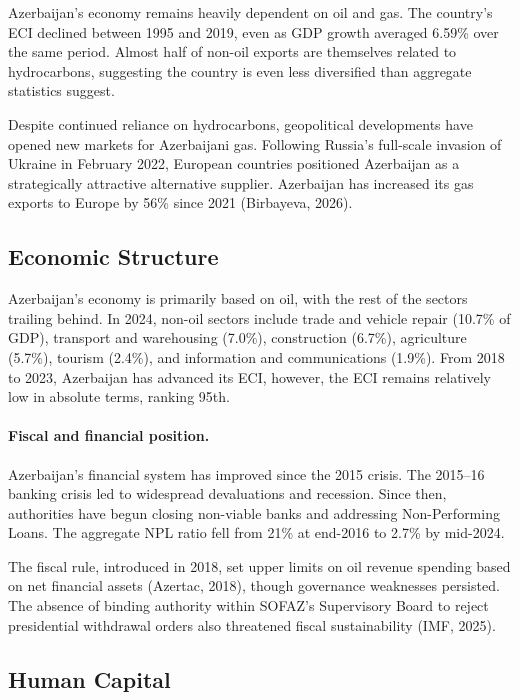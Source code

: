 \documentclass[12pt,a4paper]{report}
\begin{document}
Azerbaijan's economy remains heavily dependent on oil and gas. The country's ECI declined between 1995 and 2019, even as GDP growth averaged 6.59\% over the same period. Almost half of non-oil exports are themselves related to hydrocarbons, suggesting the country is even less diversified than aggregate statistics suggest.

Despite continued reliance on hydrocarbons, geopolitical developments have opened new markets for Azerbaijani gas. Following Russia's full-scale invasion of Ukraine in February 2022, European countries positioned Azerbaijan as a strategically attractive alternative supplier. Azerbaijan has increased its gas exports to Europe by 56\% since 2021 (Birbayeva, 2026).

\subsection{Economic Structure}

Azerbaijan's economy is primarily based on oil, with the rest of the sectors trailing behind. In 2024, non-oil sectors include trade and vehicle repair (10.7\% of GDP), transport and warehousing (7.0\%), construction (6.7\%), agriculture (5.7\%), tourism (2.4\%), and information and communications (1.9\%). From 2018 to 2023, Azerbaijan has advanced its ECI, however, the ECI remains relatively low in absolute terms, ranking 95th.

\paragraph{Fiscal and financial position.} Azerbaijan's financial system has improved since the 2015 crisis. The 2015--16 banking crisis led to widespread devaluations and recession. Since then, authorities have begun closing non-viable banks and addressing Non-Performing Loans. The aggregate NPL ratio fell from 21\% at end-2016 to 2.7\% by mid-2024.

The fiscal rule, introduced in 2018, set upper limits on oil revenue spending based on net financial assets (Azertac, 2018), though governance weaknesses persisted. The absence of binding authority within SOFAZ's Supervisory Board to reject presidential withdrawal orders also threatened fiscal sustainability (IMF, 2025).

\subsection{Human Capital}
\end{document}
